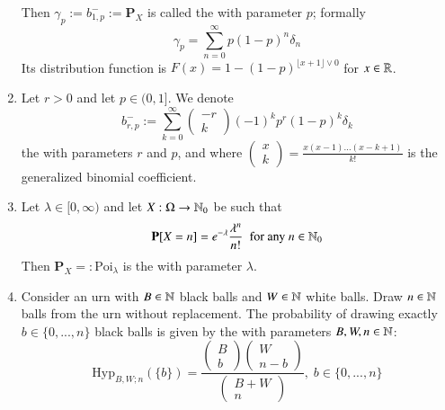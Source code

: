 \documentclass[12pt, a4paper, oneside, openright, titlepage]{book}
\begin{document}
\begin{eg}
\begin{enumerate}[label=\roman*]
\begin{equation*}
        \end{equation*}
            Then $\gamma_p := b^-_{1,p} := \mathbf{P}_X$ is called the  with parameter $p$; formally \begin{equation*}
                \gamma_p = \sum_{n=0}^{\infty}p(1-p)^n\delta_n
            \end{equation*}
            Its distribution function is $F(x) = 1-(1-p)^{\lfloor x+1\rfloor\lor0}$ for $x \in \mathbb R$.
        \item Let $r > 0$ and let $p \in (0,1]$. We denote \begin{equation*}
                b^-_{r,p} := \sum_{k=0}^{\infty}\begin{pmatrix} -r \\ k\end{pmatrix}(-1)^kp^r(1-p)^k\delta_k
        \end{equation*}
            the  with parameters $r$ and $p$, and where $\begin{pmatrix} x\\ k\end{pmatrix} = \frac{x(x-1)...(x-k+1)}{k!}$ is the generalized binomial coefficient.
            \item Let $\lambda \in [0,\infty)$ and let $X:\Omega\rightarrow \mathbb N_0$ be such that \begin{equation*}
                    \mathbf{P}[X = n] = e^{-\lambda}\frac{\lambda^n}{n!}\;\text{ for any } n \in \mathbb N_0
            \end{equation*}
            Then $\mathbf{P}_X =: \text{Poi}_{\lambda}$ is the  with parameter $\lambda$.
        \item Consider an urn with $B \in \mathbb N$ black balls and $W \in \mathbb N$ white balls. Draw $n \in \mathbb N$ balls from the urn without replacement. The probability of drawing exactly $b \in \{0,...,n\}$ black balls is given by the  with parameters $B,W,n \in \mathbb N$: \begin{equation*}
                \text{Hyp}_{B,W;n}(\{b\}) = \frac{\begin{pmatrix} B \\ b\end{pmatrix}\begin{pmatrix} W\\ n-b\end{pmatrix}}{\begin{pmatrix} B+W \\ n\end{pmatrix}},\;b\in\{0,...,n\}

\end{equation*}
\end{enumerate}
\end{eg}
\end{document}
